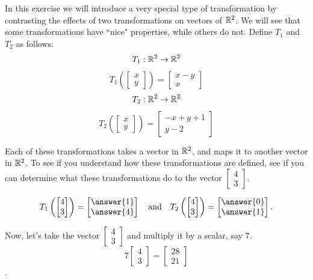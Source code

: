 \documentclass{ximera}
\begin{document}
\begin{exploration}\label{init:lintransintro} In this exercise we will introduce a very special type of transformation by contrasting the effects of two transformations on vectors of $\mathbb{R}^2$.  We will see that some transformations have ``nice" properties, while others do not.  Define $T_1$ and $T_2$ as follows:
$$T_1:\mathbb{R}^2\rightarrow\mathbb{R}^2$$
$$T_1\left(\begin{bmatrix}
x\\
y
\end{bmatrix}\right)=\begin{bmatrix}
x-y\\
x
\end{bmatrix}$$
$$T_2:\mathbb{R}^2\rightarrow\mathbb{R}^2$$
$$T_2\left(\begin{bmatrix}
x\\
y
\end{bmatrix}\right)=\begin{bmatrix}
-x+y+1\\
y-2
\end{bmatrix}$$

Each of these transformations takes a vector in $\mathbb{R}^2$, and maps it to another vector in $\mathbb{R}^2$.  To see if you understand how these transformations are defined, see if you can determine what these transformations do to the vector $\begin{bmatrix}
4\\
3
\end{bmatrix}$. 

$$
T_1\left(\begin{bmatrix}
4\\
3
\end{bmatrix}\right)=\begin{bmatrix}
\answer{1}\\
\answer{4}
\end{bmatrix} \quad \text{and} \quad
T_2\left(\begin{bmatrix}
4\\
3
\end{bmatrix}\right)=\begin{bmatrix}
\answer{0}\\
\answer{1}\end{bmatrix}.$$




Now, let's take the vector $\begin{bmatrix}
4\\
3
\end{bmatrix}$ and multiply it by a scalar, say $7$.
$$7\begin{bmatrix}
4\\
3
\end{bmatrix} = \begin{bmatrix}
28\\
21
\end{bmatrix}$$.  


\end{exploration}
\end{document}
